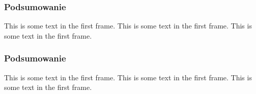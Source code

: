 \begin{frame}
    \frametitle{Podsumowanie}

    This is some text in the first frame. This is some text in the first frame. This is some text in the first frame.

\end{frame}

\begin{frame}
    \frametitle{Podsumowanie}

    This is some text in the first frame. This is some text in the first frame. This is some text in the first frame.
    
\end{frame}